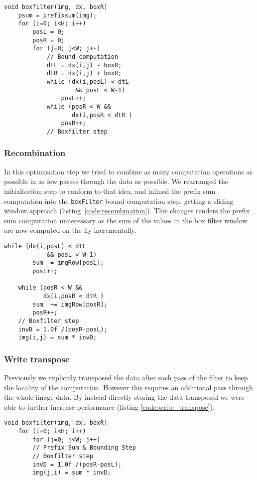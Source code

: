 \begin{lstlisting}[caption=Inlining of the bound computation, label=code:inlining]
void boxfilter(img, dx, boxR) 
    psum = prefixsum(img);
    for (i=0; i<H; i++)
        posL = 0;
        posR = 0;
        for (j=0; j<W; j++)
            // Bound computation
            dtL = dx(i,j) - boxR;
            dtR = dx(i,j) + boxR;
            while (dx(i,posL) < dtL 
                    && posL < W-1)
                posL++;
            while (posR < W && 
                   dx(i,posR < dtR )
                posR++;
            // Boxfilter step
\end{lstlisting}

\subsubsection{Recombination}

In this optimisation step we tried to combine as many computation operations as possible in as few passes through the data as possible. We rearranged the initialisation step to conform to that idea, and inlined the prefix sum computation into the \lstinline{boxFilter} bound computation step, getting a sliding window approach (listing~\ref{code:recombination}). This changes renders the prefix sum computation unnecessary as the sum of the values in the box filter window are now computed on the fly incrementally.

\begin{lstlisting}[caption=Recombination, label=code:recombination]
    while (dx(i,posL) < dtL 
            && posL < W-1)
        sum -= imgRow[posL];
        posL++;

    while (posR < W && 
           dx(i,posR < dtR )
        sum  += imgRow[posR];
        posR++;
    // Boxfilter step
    invD = 1.0f /(posR-posL);
    img(i,j) = sum * invD;
\end{lstlisting}

\subsubsection{Write transpose}\label{sec:method:write_transposed}

Previously we explicitly transposed the data after each pass of the filter to keep the locality of the computation. However this requires an additional pass through the whole image data. By instead directly storing the data transposed we were able to further increase performance (listing \ref{code:write_transpose}). 
\begin{lstlisting}[caption=Write transpose, label=code:write_transpose]
void boxfilter(img, dx, boxR) 
    for (i=0; i<H; i++)
        for (j=0; j<W; j++)
        // Prefix Sum & Bounding Step
        // Boxfilter step
        invD = 1.0f /(posR-posL);
        img(j,i) = sum * invD;
\end{lstlisting}

